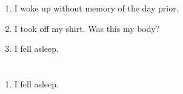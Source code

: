 \documentclass{article}
\begin{document}
    \begin{enumerate}
    
    \item I woke up without memory of the day prior.\\
    
    \item I took off my shirt. Was this my body?\\
    
    \item I fell asleep.\\
    
    \end{enumerate}
     
    \newpage
    
    \section{}
    
    \begin{enumerate}
    
    \item I fell asleep.\\
    
    \end{enumerate}
     
    \newpage
    
    \section{}
    
\end{document}
